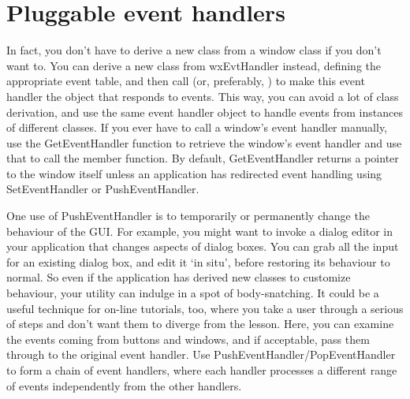 %
% 

\section{Pluggable event handlers}

In fact, you don't have to derive a new class from a window class
if you don't want to. You can derive a new class from wxEvtHandler instead,
defining the appropriate event table, and then call
\rtfsp{} (or, preferably,
\rtfsp{}) to make this
event handler the object that responds to events. This way, you can avoid
a lot of class derivation, and use the same event handler object to
handle events from instances of different classes. If you ever have to call a window's event handler
manually, use the GetEventHandler function to retrieve the window's event handler and use that
to call the member function. By default, GetEventHandler returns a pointer to the window itself
unless an application has redirected event handling using SetEventHandler or PushEventHandler.

One use of PushEventHandler is to temporarily or permanently change the
behaviour of the GUI. For example, you might want to invoke a dialog editor
in your application that changes aspects of dialog boxes. You can
grab all the input for an existing dialog box, and edit it `in situ',
before restoring its behaviour to normal. So even if the application
has derived new classes to customize behaviour, your utility can indulge
in a spot of body-snatching. It could be a useful technique for on-line
tutorials, too, where you take a user through a serious of steps and
don't want them to diverge from the lesson. Here, you can examine the events
coming from buttons and windows, and if acceptable, pass them through to
the original event handler. Use PushEventHandler/PopEventHandler
to form a chain of event handlers, where each handler processes a different
range of events independently from the other handlers.

